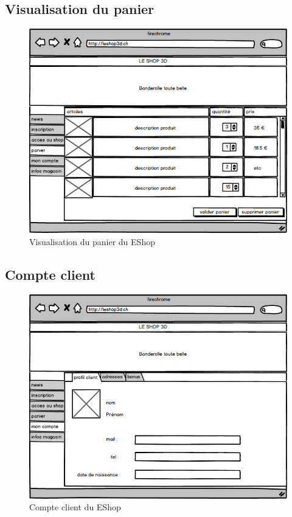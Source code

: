 \documentclass[12pt]{article}
\begin{document}
\subsection{Visualisation du panier}

\begin{figure}[ht]
    \center
    \includegraphics[scale=0.6]{../Maquettes/visualisation_panier.jpeg}
    \caption*{Visualisation du panier du EShop}
\end{figure}

\subsection{Compte client}

\begin{figure}[ht]
    \center
    \includegraphics[scale=0.6]{../Maquettes/compte_client.jpeg}
    \caption*{Compte client du EShop}
\end{figure}
\end{document}
